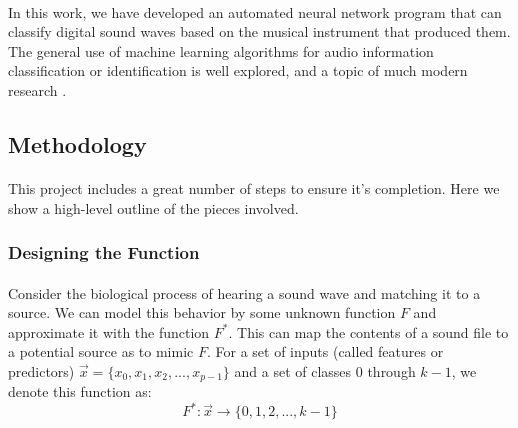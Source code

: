 \documentclass[12pt,letterpaper]{article}
\begin{document}
\paragraph*{}In this work, we have developed an automated neural network program that can classify digital sound waves based on the musical instrument that produced them. The general use of machine learning algorithms for audio information classification or identification is well explored, and a topic of much modern research \cite{Khan,Liu,Mierswa,Serizel,Zhang}.

\paragraph*{}



\newpage
\subsection{Methodology}
\label{sec-Methodology}

\paragraph*{}This project includes a great number of steps to ensure it's completion. Here we show a high-level outline of the pieces involved.


\subsubsection{Designing the Function}

\paragraph*{}Consider the biological process of hearing a sound wave and matching it to a source. We can model this behavior by some unknown function $F$ and approximate it with the function $F^*$. This can map the contents of a sound file to a potential source as to mimic $F$. For a set of inputs (called features or predictors) $\vec{x} = \big\{ x_0 , x_1 , x_2 , ... , x_{p-1} \big\}$ and a set of classes $0$ through $k-1$, we denote this function as:
\begin{equation}
\label{eqn-MappingFunction}
F^*: \vec{x} \rightarrow \big\{ 0 , 1 , 2 , ... , k-1 \big\}
\end{equation}
\end{document}
